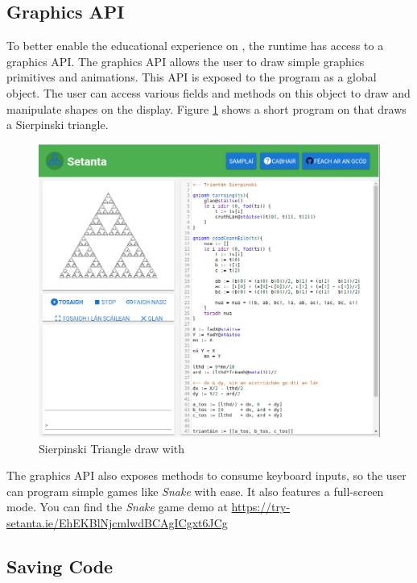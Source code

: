 \subsection{Graphics API}

To better enable the educational experience on \trys{}, the \Setanta{} runtime has access to a graphics API. The graphics API allows the user to draw simple graphics primitives and animations. This API is exposed to the \Setanta{} program as a global object. The user can access various fields and methods on this object to draw and manipulate shapes on the display. Figure \ref{sierpinksitriangle} shows a short program on \trys{} that draws a Sierpinski triangle.

\begin{figure}
    \caption{Sierpinski Triangle draw with \Setanta{}}
    \label{sierpinksitriangle}
    \begin{center}
    \includegraphics[scale=0.45]{sierpinskitriangle}
    \end{center}
\end{figure}

The graphics API also exposes methods to consume keyboard inputs, so the user can program simple games like \emph{Snake} with ease. It also features a full-screen mode. You can find the \emph{Snake} game demo at \href{https://try-setanta.ie/EhEKBlNjcmlwdBCAgICgxt6JCg}{https://try-setanta.ie/EhEKBlNjcmlwdBCAgICgxt6JCg}

\subsection{Saving Code}

